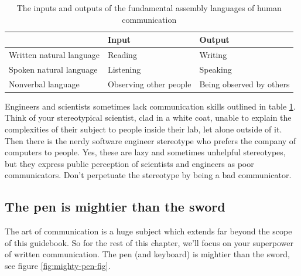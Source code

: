 \documentclass[
]{book}
\begin{document}
\begin{table}

\caption{\label{tab:iotable}The inputs and outputs of the fundamental assembly languages of human communication }
\centering
\begin{tabular}[t]{lll}
\toprule
 & Input & Output\\
\midrule
Written natural language & Reading & Writing\\
Spoken natural language & Listening & Speaking\\
Nonverbal language & Observing other people & Being observed by others\\
\bottomrule
\end{tabular}
\end{table}

Engineers and scientists sometimes lack communication skills outlined in table \ref{tab:iotable}. Think of your stereotypical scientist, clad in a white coat, unable to explain the complexities of their subject to people inside their lab, let alone outside of it. Then there is the nerdy software engineer stereotype who prefers the company of computers to people. Yes, these are lazy and sometimes unhelpful stereotypes, but they express public perception of scientists and engineers as poor communicators. Don't perpetuate the stereotype by being a bad communicator.

\hypertarget{mightier}{%
\subsection{The pen is mightier than the sword}\label{mightier}}

The art of communication is a huge subject which extends far beyond the scope of this guidebook. So for the rest of this chapter, we'll focus on your superpower of written communication. The pen (and keyboard) is mightier than the sword, see figure \ref{fig:mighty-pen-fig}.
\end{document}
